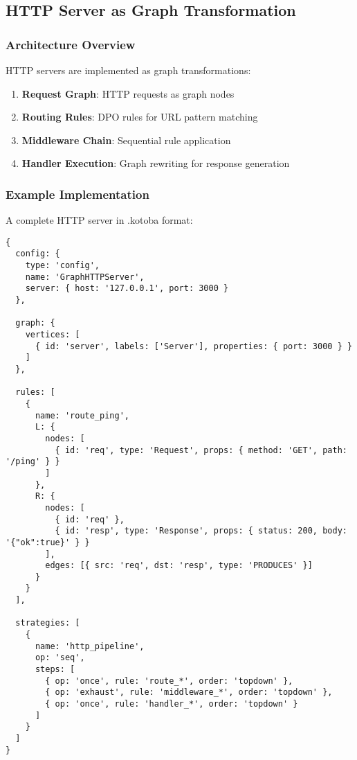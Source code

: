 \documentclass[11pt,a4paper]{article}
\begin{document}
\subsection{HTTP Server as Graph Transformation}
\label{subsec:http_server}

\subsubsection{Architecture Overview}
\label{subsubsec:http_architecture}

HTTP servers are implemented as graph transformations:

\begin{enumerate}
\item \textbf{Request Graph}: HTTP requests as graph nodes
\item \textbf{Routing Rules}: DPO rules for URL pattern matching
\item \textbf{Middleware Chain}: Sequential rule application
\item \textbf{Handler Execution}: Graph rewriting for response generation
\end{enumerate}

\subsubsection{Example Implementation}
\label{subsubsec:http_example}

A complete HTTP server in .kotoba format:

\begin{lstlisting}[language=jsonnet,caption=HTTP Server Implementation]
{
  config: {
    type: 'config',
    name: 'GraphHTTPServer',
    server: { host: '127.0.0.1', port: 3000 }
  },

  graph: {
    vertices: [
      { id: 'server', labels: ['Server'], properties: { port: 3000 } }
    ]
  },

  rules: [
    {
      name: 'route_ping',
      L: {
        nodes: [
          { id: 'req', type: 'Request', props: { method: 'GET', path: '/ping' } }
        ]
      },
      R: {
        nodes: [
          { id: 'req' },
          { id: 'resp', type: 'Response', props: { status: 200, body: '{"ok":true}' } }
        ],
        edges: [{ src: 'req', dst: 'resp', type: 'PRODUCES' }]
      }
    }
  ],

  strategies: [
    {
      name: 'http_pipeline',
      op: 'seq',
      steps: [
        { op: 'once', rule: 'route_*', order: 'topdown' },
        { op: 'exhaust', rule: 'middleware_*', order: 'topdown' },
        { op: 'once', rule: 'handler_*', order: 'topdown' }
      ]
    }
  ]
}
\end{lstlisting}
\end{document}
